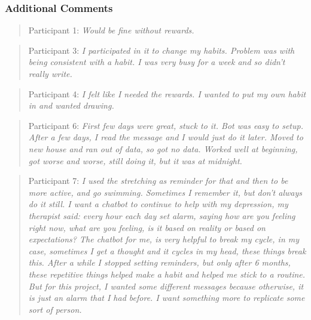 \subsubsection*{Additional Comments}
\begin{quote}
Participant 1: \textit{Would be fine without rewards.}
\end{quote}
\begin{quote}
Participant 3: \textit{I participated in it to change my habits. Problem was with being consistent with a habit. I was very busy for a week and so didn't really write.}
\end{quote}
\begin{quote}
Participant 4: \textit{I felt like I needed the rewards. I wanted to put my own habit in and wanted drawing.}
\end{quote}
\begin{quote}
Participant 6: \textit{First few days were great, stuck to it. Bot was easy to setup. After a few days, I read the message and I would just do it later. Moved to new house and ran out of data, so got no data. Worked well at beginning, got worse and worse, still doing it, but it was at midnight.}
\end{quote}
\begin{quote}
Participant 7: \textit{I used the stretching as reminder for that and then to be more active, and go swimming. Sometimes I remember it, but don't always do it still. I want a chatbot to continue to help with my depression, my therapist said: every hour each day set alarm, saying how are you feeling right now, what are you feeling, is it based on reality or based on expectations? The chatbot for me, is very helpful to break my cycle, in my case, sometimes I get a thought and it cycles in my head, these things break this. After a while I stopped setting reminders, but only after 6 months, these repetitive things helped make a habit and helped me stick to a routine. But for this project, I wanted some different messages because otherwise, it is just an alarm that I had before. I want something more to replicate some sort of person.}
\end{quote}
